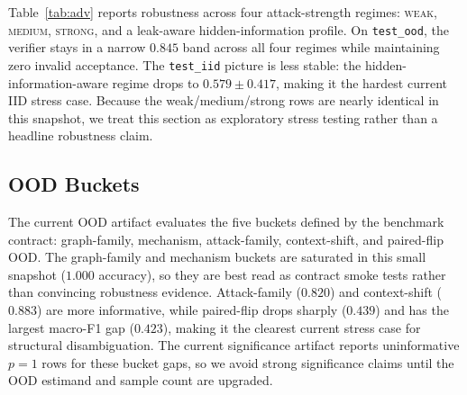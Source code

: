 \documentclass{article}
\theoremstyle{plain}
\theoremstyle{definition}
\theoremstyle{remark}
\begin{document}
Table~\ref{tab:adv} reports robustness across four attack-strength regimes:
\textsc{weak}, \textsc{medium}, \textsc{strong}, and a leak-aware
hidden-information profile. On \texttt{test\_ood}, the verifier stays
in a narrow $0.845$ band across all four regimes while maintaining zero invalid
acceptance. The \texttt{test\_iid} picture is less stable: the
hidden-information-aware regime drops to $0.579 \pm 0.417$, making it the
hardest current IID stress case. Because the weak/medium/strong rows are nearly
identical in this snapshot, we treat this section as exploratory stress
testing rather than a headline robustness claim.

\begin{table}[t]
\caption{Adversarial robustness. Mean $\pm$ std across seeds; full results are
  reported in the accompanying \texttt{exp\_adversarial\_robustness.md}
  artifact.}
\label{tab:adv}
\vskip 0.05in
\begin{center}
\begin{small}
\begin{sc}
\end{sc}
\end{small}
\end{center}
\end{table}

\subsection{OOD Buckets}

The current OOD artifact evaluates the five buckets defined by the benchmark
contract: graph-family, mechanism, attack-family, context-shift, and
paired-flip OOD. The graph-family and mechanism buckets are saturated in this
small snapshot ($1.000$ accuracy), so they are best read as contract smoke tests
rather than convincing robustness evidence. Attack-family ($0.820$) and
context-shift ($0.883$) are more informative, while paired-flip drops sharply
($0.439$) and has the largest macro-F1 gap ($0.423$), making it the clearest
current stress case for structural disambiguation. The current significance
artifact reports uninformative $p=1$ rows for these bucket gaps, so we avoid
strong significance claims until the OOD estimand and sample count are upgraded.
\end{document}
